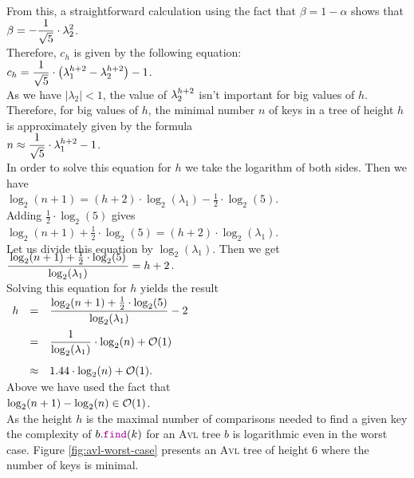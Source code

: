 From this, a straightforward calculation using the fact that $\beta = 1 - \alpha$ shows that 
\\[0.2cm]
\hspace*{1.3cm}
$\displaystyle \beta  = -\frac{1}{\sqrt{5}} \cdot \lambda_2^2$.
\\[0.2cm]
Therefore, $c_h$ is given by the following equation:
\\[0.2cm]
\hspace*{1.3cm}
$c_h = \displaystyle \frac{1}{\sqrt{5}} \cdot \left( \lambda_1^{h+2} - \lambda_2^{h+2} \right) -1$.  
\\[0.2cm]
As we have  $|\lambda_2| < 1$, the value of  $\displaystyle\lambda_2^{h+2}$ isn't important for big
values of $h$.  Therefore, for big values of $h$, the minimal number  $n$ of keys in a tree of
height  $h$ is approximately given by the formula \\[0.2cm]
\hspace*{1.3cm} $n \approx \displaystyle \frac{1}{\sqrt{5}} \cdot \lambda_1^{h+2} - 1$. \\[0.2cm]
In order to solve this equation for  $h$ we take the logarithm of both sides.  Then we have
\\[0.2cm]
\hspace*{1.3cm}
$\log_2(n+1) = (h+2) \cdot \log_2(\lambda_1) - \frac{1}{2}\cdot \log_2(5)$.
\\[0.2cm]
Adding  $\frac{1}{2}\cdot \log_2(5)$ gives
\\[0.2cm]
\hspace*{1.3cm}
$\log_2(n+1) + \frac{1}{2}\cdot \log_2(5) = (h+2) \cdot \log_2(\lambda_1)$.
\\[0.2cm]
Let us divide this equation by  $\log_2(\lambda_1)$.  Then we get
\\[0.4cm]
\hspace*{1.3cm}
$\ds \bruch{\log_2(n+1) + \frac{1}{2}\cdot \log_2(5)}{\log_2(\lambda_1)} = h+2$.
\\[0.2cm]
Solving this equation for  $h$ yields the result 
\\[0.4cm]
\hspace*{1.3cm} 
$
\begin{array}[t]{lcl}
h & = & \displaystyle \frac{\log_2(n+1) + \frac{1}{2}\cdot \log_2(5)}{\log_2(\lambda_1)} - 2 \\[0.4cm]
  & = & \displaystyle \frac{1}{\log_2(\lambda_1)}\cdot \log_2(n) + \mathcal{O}(1) \\[0.5cm]
  & \approx & 1.44 \cdot \log_2(n) + \mathcal{O}(1).
\end{array} 
$
\\[0.2cm]
Above we have used the fact that 
\\[0.2cm]
\hspace*{1.3cm}
$\log_2(n+1) - \log_2(n) \in \mathcal{O}(1)$. 
\\[0.2cm]
As the height $h$ is the maximal number of comparisons needed to find a given key
the complexity of $b.\mytt{find}(k)$ for an \textsc{Avl} tree $b$ is logarithmic even in the worst case.
Figure 
\ref{fig:avl-worst-case} presents an  \textsc{Avl} tree of height 6 where the number of keys is minimal.



